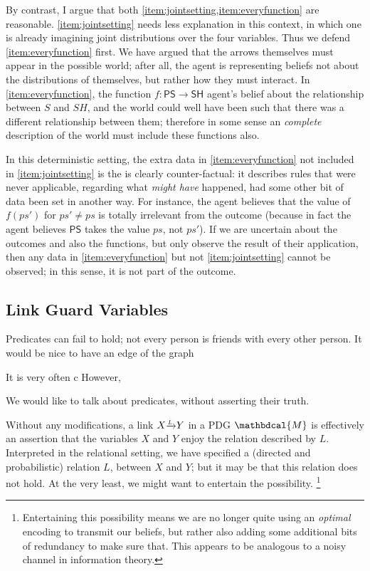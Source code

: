 \documentclass{article}
\theoremstyle{plain}
\theoremstyle{definition}
\theoremstyle{remark}
\newcommand{\dg}[1]{\mathbdcal{#1}}
\newcommand{\var}[1]{\mathsf{#1}}
\newcommand{\ed}[3]{#2
	\overset{\smash{\mskip-5mu\raisebox{-4.2pt}{\scalebox{0.6}{$#1$}}}}{\raisebox{-0.5pt}{$\xrightarrow{\hphantom{\scalebox{0.6}{$#1$}}}$}} #3}
\begin{document}
\begin{example}
    By contrast, I argue that both \cref{item:jointsetting,item:everyfunction} are reasonable. \cref{item:jointsetting} needs less explanation in this context, in which one is already imagining joint distributions over the four variables. Thus we defend \cref{item:everyfunction} first.
    We have argued that the arrows themselves must appear in the possible world; after all, the agent is representing beliefs not about the distributions of themselves, but rather how they must interact.
    In \cref{item:everyfunction}, the function $f: \var{PS} \to \var{SH}$ agent's belief about the relationship between $S$ and $SH$, and the world could well have been such that there was a different relationship between them; therefore in some sense an \emph{complete} description of the world must include these functions also. 
         
    In this deterministic setting, the extra data in \cref{item:everyfunction} not included in \cref{item:jointsetting} is the is clearly counter-factual: it describes rules that were never applicable, regarding what \emph{might have} happened, had some other bit of data been set in another way. For instance, the agent believes that the value of $f(ps')$ for $ps' \neq ps$ is totally irrelevant from the outcome (because in fact the agent believes $\var{PS}$ takes the value $ps$, not $ps'$). 
    If we are uncertain about the outcomes and also the functions, but only observe the result of their application, then any data in \cref{item:everyfunction} but not \cref{item:jointsetting} cannot be observed; in this sense, it is not part of the outcome. 
\end{example}



\subsection{Link Guard Variables} \label{sec:link-gurad}

Predicates can fail to hold; not every person is friends with every other person. It would be nice to have an edge of the graph 

It is very often c
However, 

We would like to talk about predicates, without asserting their truth. 


Without any modifications, a link $\ed LXY$ in a PDG $\dg M$ is effectively an assertion that the variables $X$ and $Y$ enjoy the relation described by $L$. Interpreted in the relational setting, we have specified a (directed and probabilistic) relation $L$, between $X$ and $Y$; but it may be that this relation does not hold. At the very least, we might want to entertain the possibility.%
\footnote{Entertaining this possibility means we are no longer quite using an \emph{optimal} encoding to transmit our beliefs, but rather also adding some additional bits of redundancy to make sure that. This appears to be analogous to a noisy channel in information theory.}
\end{document}
